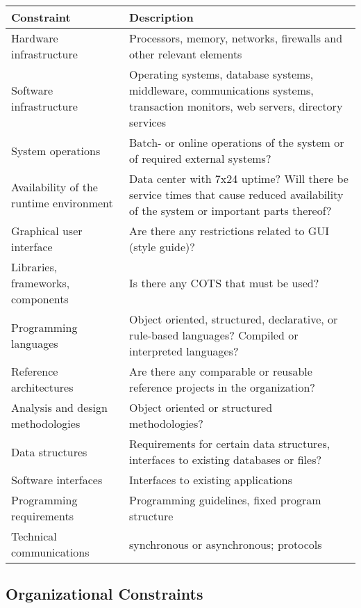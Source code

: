
%
%
\begin{center}
    \begin{tabular}{| l | p{6cm}  |}
		\hline
		\textbf {Constraint} & \textbf {Description} \\ \hline
		Hardware infrastructure & Processors, memory, networks, firewalls and other relevant elements\\ \hline
		Software infrastructure & Operating systems, database systems, middleware, communications systems, transaction monitors, web servers, directory services\\ \hline
		System operations & Batch- or online operations of the system or of required external systems?\\ \hline
		Availability of the runtime environment & Data center with 7x24 uptime? Will there be service times that cause reduced availability of the system or important parts thereof?\\ \hline
		Graphical user interface  & Are there any restrictions related to GUI (style guide)?\\ \hline
		Libraries, frameworks, components & Is there any COTS that must be used?\\ \hline
		Programming languages  & Object oriented, structured, declarative, or rule-based languages? Compiled or interpreted languages?\\ \hline
		Reference architectures  &  Are there any comparable or reusable reference projects in the organization?\\ \hline
		Analysis and design methodologies  & Object oriented or structured methodologies?\\ \hline
		Data structures & Requirements for certain data structures, interfaces to existing databases or files?\\ \hline
		Software interfaces & Interfaces to existing applications\\ \hline
		Programming requirements  & Programming guidelines, fixed program structure\\ \hline
		Technical communications  & synchronous or asynchronous; protocols\\ \hline
    \end{tabular}
\end{center}

\subsection{Organizational Constraints}

